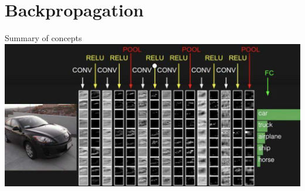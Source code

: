 \documentclass[default, aspectratio=169]{beamer}
\begin{document}
	\section{Backpropagation}
	\begin{frame}{Summary of concepts}
		\centering
		\includegraphics[keepaspectratio, scale=0.5]{pic/car.png}
	\end{frame}
	
\end{document}
